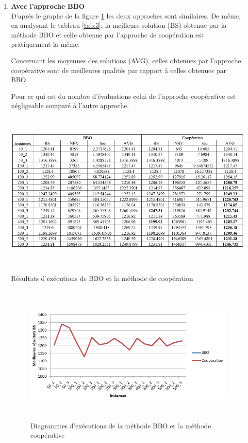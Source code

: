 \begin{enumerate}[label=\alph*)]
	\item \textbf{Avec l’approche BBO}\\
D’après le graphe de la figure \ref{fig:DEMBBOMC} les deux approches sont similaires. De même, en analysant le tableau \ref{tab:3}, la meilleure solution (BS) obtenue par la méthode BBO et celle obtenue par l’approche de coopération est pratiquement la même.

Concernant les moyennes des solutions (AVG), celles obtenues par l’approche coopérative sont de meilleures qualités par rapport à celles obtenues par BBO.

Pour ce qui est du nombre d'évaluations celui de l’approche coopérative est négligeable comparé à l’autre approche.

\begin{table}[H]
	\includegraphics[width=15cm,height=8cm]{Chap5/t3.png}
	\caption{Résultats d’exécutions de BBO et la méthode de coopération}
	\label{tab:3}
\end{table}

\begin{figure}[H]
	\centering
	\includegraphics[width=16cm,height=7cm]{Chap5/3.png}
	\caption{Diagrammes d’exécutions de la méthode BBO et la méthode coopérative}
	\label{fig:DEMBBOMC}
\end{figure}


\end{enumerate}
